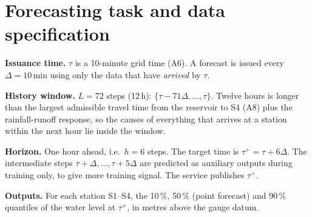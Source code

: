 \section{Forecasting task and data specification}
\textbf{Issuance time.} $\tau$ is a 10-minute grid time (A6). A forecast is issued every
$\Delta=10$\,min using only the data that have \emph{arrived} by $\tau$.

\textbf{History window.} $L=72$ steps (12\,h): $\{\tau-71\Delta,\dots,\tau\}$. Twelve hours is longer
than the largest admissible travel time from the reservoir to S4 (A8) plus the rainfall-runoff
response, so the causes of everything that arrives at a station within the next hour lie inside
the window.

\textbf{Horizon.} One hour ahead, i.e.\ $h=6$ steps. The target time is $\tau^{+}=\tau+6\Delta$. The
intermediate steps $\tau+\Delta,\dots,\tau+5\Delta$ are predicted as auxiliary outputs during
training only, to give more training signal. The service publishes $\tau^{+}$.

\textbf{Outputs.} For each station S1--S4, the 10\,\%, 50\,\% (point forecast) and 90\,\% quantiles of the
water level at $\tau^{+}$, in metres above the gauge datum.

